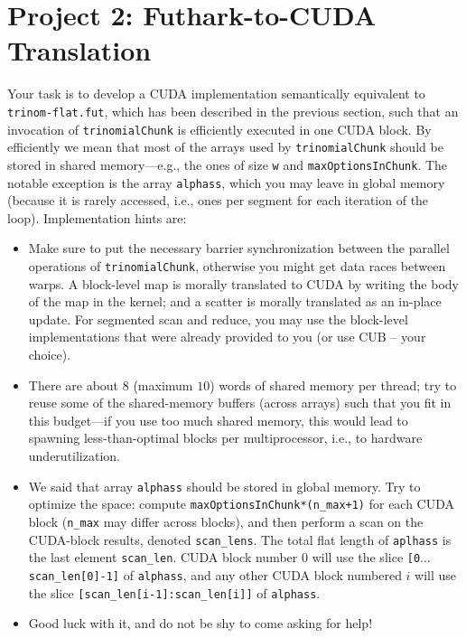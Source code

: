 \documentclass[a4paper,11pt]{article}
\begin{document}
\section{Project 2: Futhark-to-CUDA Translation}

Your task is to develop a CUDA implementation semantically equivalent to 
{\tt trinom-flat.fut}, which has been described in the previous
section, such that an invocation  of {\tt trinomialChunk} is efficiently 
executed in one CUDA block. By efficiently we mean that most of the arrays 
used by {\tt trinomialChunk} should be stored in shared memory---e.g.,
the ones of size {\tt w} and {\tt maxOptionsInChunk}. The notable exception
is the array {\tt alphass}, which you may leave in global memory (because
it is rarely accessed, i.e., ones per segment for each iteration of the loop).
%
Implementation hints are:
\begin{itemize}

    \item[(1)] Make sure to put the necessary barrier synchronization between
            the parallel operations of {\tt trinomialChunk}, otherwise you
            might get data races between warps. A block-level map is 
            morally translated to CUDA by writing the body of the map 
            in the kernel; and a scatter is morally translated as an
            in-place update. For segmented scan and reduce, you may
            use the block-level implementations that were already
            provided to you (or use CUB -- your choice).             

    \item[(2)] There are about $8$ (maximum $10$) words of shared memory per 
            thread; try to reuse some of the shared-memory buffers 
            (across arrays) such that you fit in this budget---if you
            use too much shared memory, this would lead to spawning
            less-than-optimal blocks per multiprocessor, i.e., 
            to hardware underutilization.

    \item[(3)]  We said that array {\tt alphass} should be stored in global
            memory. Try to optimize the space: compute 
            {\tt maxOptionsInChunk*(n\_max+1)} for each CUDA block
            ({\tt n\_max} may differ across blocks), and then perform 
            a scan on the CUDA-block results, denoted {\tt scan\_lens}. 
            The total flat length of {\tt aplhass} is the last element 
            {\tt scan\_len}. CUDA block number $0$ will use the slice
            {\tt [0$\ldots$scan\_len[0]-1]} of {\tt alphass}, 
            and any other CUDA block numbered $i$ will use the slice 
            {\tt[scan\_len[i-1]:scan\_len[i]]} of {\tt alphass}.

    \item[(4)]  Good luck with it, and do not be shy to come asking for help!
\end{itemize}
\end{document}
